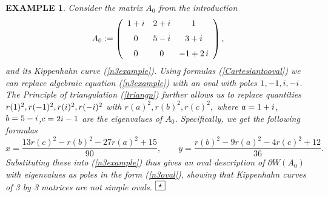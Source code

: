 \documentclass[10pt,a4paper,reqno]{amsart}
\newtheorem{exa}[defi]{\bf E\scriptsize XAMPLE \normalsize}
\def\kopr{\hfill\raisebox{3pt}{\framebox{$\star$}}}
\newenvironment{example}{\begin{exa}\rm}{$\kopr$\end{exa}}
\newcommand{\imag}{{\rm i}}
\begin{document}
\begin{example}
Consider the matrix $A_0$ from the introduction
$$
A_0:=\left( \begin {array}{ccc} 1+i&2+i&1\\ \noalign{\medskip}0&5-i&3+i
\\ \noalign{\medskip}0&0&-1+2\,i\end {array} \right),
$$
and its Kippenhahn curve (\ref{n3example}).
Using formulas (\ref{Cartesiantooval}) we can replace algebraic equation (\ref{n3example}) with an oval with poles $1,-1,\imag,-\imag$. The Principle of triangulation (\ref{triangp}) further allows us to replace quantities
$
r(1)^2,r(-1)^2,r(\imag)^2,r(-\imag)^2
$
with
$
r(a)^2,r(b)^2,r(c)^2,
$
where $a=1+\imag$,$b=5-\imag$,$c=2\imag-1$ are the eigenvalues of $A_0$. Specifically, we get the following formulas
$$
x=\frac{13 r(c)^2-r(b)^2-27 r(a)^2+15}{90},\qquad y=\frac{r(b)^2-9r(a)^2-4 r(c)^2+12}{36}.
$$
Substituting these into (\ref{n3example}) thus gives an oval description of $\partial W(A_0)$ with eigenvalues as poles in the form (\ref{n3oval}), showing that Kippenhahn curves of 3 by 3 matrices are not simple ovals.  
\end{example}
\end{document}
